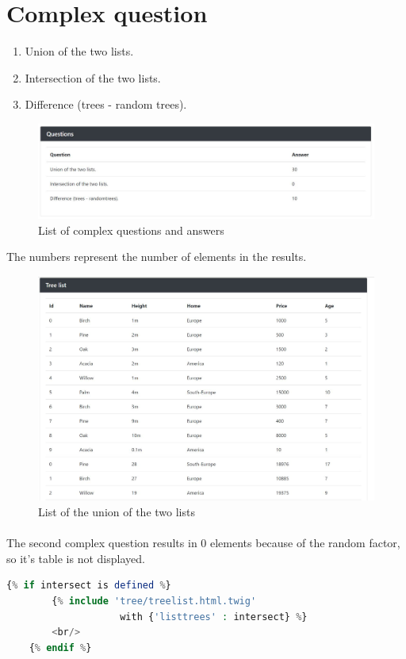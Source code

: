 \documentclass[]{article}
\begin{document}
\section{Complex question}
\begin{enumerate}
    \item Union of the two lists.
    \item Intersection of the two lists.
    \item Difference (trees - random trees).
\end{enumerate}
\begin{figure}[h]
    \centering
    \includegraphics[width=\textwidth]{qa0.JPG}
    \caption{List of complex questions and answers}
\end{figure}
The numbers represent the number of elements in the results.
\begin{figure}[h]
    \centering
    \includegraphics[width=\textwidth]{qa2.JPG}
    \caption{List of the union of the two lists}
\end{figure}
\paragraph{}
\newpage
The second complex question results in 0 elements because of the random factor, so it's table is not displayed.
\begin{lstlisting}[language=php, frame=single]
    {% if intersect is defined %}
        {% include 'tree/treelist.html.twig' 
                    with {'listtrees' : intersect} %}
        <br/>
    {% endif %}
\end{lstlisting}
\end{document}
